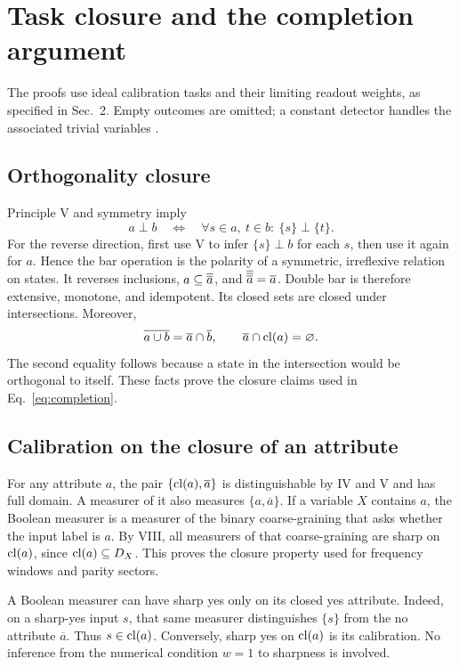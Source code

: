 \section{Task closure and the completion argument}\label{app:closure}
The proofs use ideal calibration tasks and their limiting readout weights, as specified in Sec.~2. Empty outcomes are omitted; a constant detector handles the associated trivial variables \cite[Sec.~6, footnote on p.~15]{cti}.

\subsection{Orthogonality closure}
Principle V and symmetry imply
\begin{equation}\label{eq:statewise}
 a\perp b\quad\Longleftrightarrow\quad
 \forall s\in a,\ t\in b:\ \{s\}\perp\{t\}.
\end{equation}
For the reverse direction, first use V to infer $\{s\}\perp b$ for each $s$, then use it again for $a$. Hence the bar operation is the polarity of a symmetric, irreflexive relation on states. It reverses inclusions, $a\subseteq\overline{\overline{a}}$, and $\overline{\overline{\overline{a}}}=\overline a$. Double bar is therefore extensive, monotone, and idempotent. Its closed sets are closed under intersections. Moreover,
\begin{equation}\label{eq:polarity}
 \overline{a\cup b}=\overline a\cap\overline b,
 \qquad \overline a\cap\cl(a)=\varnothing.
\end{equation}
The second equality follows because a state in the intersection would be orthogonal to itself. These facts prove the closure claims used in Eq.~\eqref{eq:completion}.

\subsection{Calibration on the closure of an attribute}
For any attribute $a$, the pair $\{\operatorname{cl}(a),\overline a\}$ is distinguishable by IV and V and has full domain. A measurer of it also measures $\{a,\overline a\}$. If a variable $X$ contains $a$, the Boolean measurer is a measurer of the binary coarse-graining that asks whether the input label is $a$. By VIII, all measurers of that coarse-graining are sharp on $\operatorname{cl}(a)$, since $\operatorname{cl}(a)\subseteq D_X$. This proves the closure property used for frequency windows and parity sectors.

A Boolean measurer can have sharp yes only on its closed yes attribute. Indeed, on a sharp-yes input $s$, that same measurer distinguishes $\{s\}$ from the no attribute $\overline a$. Thus $s\in\operatorname{cl}(a)$. Conversely, sharp yes on $\operatorname{cl}(a)$ is its calibration. No inference from the numerical condition $w=1$ to sharpness is involved.


